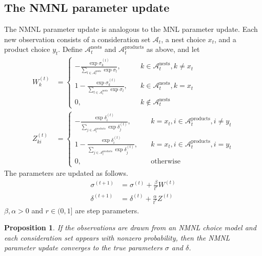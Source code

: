 \documentclass[preprint,12pt,authoryear]{elsarticle}
\newtheorem{proposition}{Proposition}
\begin{document}
\subsection{The NMNL parameter update}
The NMNL parameter update is analogous to the MNL parameter update. Each new observation consists of a consideration set $\mathcal{A}_t$, a nest choice $x_t$, and a product choice $y_t$. Define $\mathcal{A}_t^{\text{nests}}$ and $\mathcal{A}_{t}^{\text{products}}$ as above, and let
\begin{align}
W^{(t)}_k &= \begin{cases}
 -  \frac{\exp \sigma^{(t)}_k}{\sum_{l\in \mathcal{A}_{t}^{\text{nests}}} \exp \sigma_l}, \quad & k \in \mathcal{A}_{t}^{\text{nests}}, k \neq x_t\\
1 -  \frac{\exp \sigma^{(t)}_k}{\sum_{l\in \mathcal{A}_{t}^{\text{nests}}} \exp \sigma_l}, \quad & k \in \mathcal{A}_{t}^{\text{nests}}, k = x_t\\
0, \quad & k \notin \mathcal{A}_{t}^{\text{nests}}
\end{cases} \\
Z^{(t)}_{ki} &= 
\begin{cases}
 - \frac{\exp \delta^{(t)}_i}{\sum_{j\in \mathcal{A}_t^{\text{products}}} \exp \delta^{(t)}_j}, \quad&k = x_t, i \in \mathcal{A}_t^{\text{products}}, i\neq y_t \\
1 - \frac{\exp \delta^{(t)}_i}{\sum_{j\in \mathcal{A}_t^{\text{products}}} \exp \delta^{(t)}_j} , \quad&k = x_t, i \in \mathcal{A}_t^{\text{products}}, i =  y_t \\
0, \quad & \text{otherwise}
\end{cases}
\end{align}
The parameters are updated as follows.
\begin{align}\label{nmnlparameterupdate}
\sigma^{(t+1)} &= \sigma^{(t)} + \frac{\beta}{t^r} W^{(t)} \\
\delta^{(t+1)} &= \delta^{(t)} +  \frac{\alpha}{t^r} Z^{(t)} 
\end{align}
$\beta, \alpha >0$ and $r \in (0, 1]$ are step parameters.

\begin{proposition}If the observations are drawn from an NMNL choice model and each consideration set appears with nonzero probability, then the NMNL parameter update converges to the true parameters $\sigma$ and $\delta$.\end{proposition}
\end{document}

